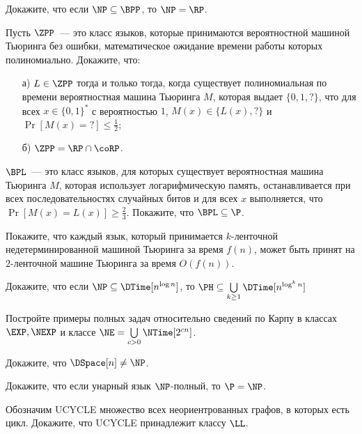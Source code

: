 

\begin{task}
    Докажите, что если $\NP \subseteq \BPP$, то $\NP = \RP$.
\end{task}


\begin{task}
    Пусть $\ZPP$~--- это класс языков, которые принимаются вероятностной машиной Тьюринга без ошибки, математическое ожидание
    времени работы которых полиномиально. Докажите, что:
    \begin{enumerate}[topsep = 0pt, itemsep = -1ex]
        \item [а)] $L \in \ZPP$ тогда и только тогда, когда существует полиномиальная по времени вероятностная машина Тьюринга
			$M$, которая выдает $\{0, 1, ?\}$, что для всех $x \in \{0, 1\}^*$ с вероятностью $1$, $M(x) \in \{L(x), ?\}$ и 
            $\Pr[M(x) = {?}] \le \frac{1}{2}$;
        \item [б)] $\ZPP = \RP \cap \coRP$.
    \end{enumerate}
\end{task}

\begin{task}
    $\BPL$~--- это класс языков, для которых существует вероятностная машина Тьюринга $M$, которая использует логарифмическую
    память, останавливается при всех последовательностях случайных битов и для всех $x$ выполняется, что $\Pr[M(x) = L(x)] \ge
    \frac{2}{3}$. Покажите, что $\BPL \subseteq \P$. 
\end{task}


\breakline

\begin{ptask}{8}
    Покажите, что каждый язык, который принимается $k$-ленточной недетерминированной машиной Тьюринга за время $f(n)$, может быть
    принят на $2$-ленточной машине Тьюринга за время $O(f(n))$.
\end{ptask}


\begin{ptask}{32}
	Докажите, что если $\NP \subseteq \DTime[n^{\log n}]$, то $\PH \subseteq \bigcup\limits_{k \ge 1} \DTime[n^{\log^k n}]$    
\end{ptask}


\begin{ptask}{35}
	Постройте примеры полных задач относительно сведений по Карпу в классах $\EXP, \NEXP$ и классе $\NE = \bigcup\limits_{c > 0}
    \NTime[2^{cn}]$.
\end{ptask}

\begin{ptask}{39}
	Докажите, что $\DSpace[n] \neq \NP$.
\end{ptask}


\begin{ptask}{41}
    Докажите, что если унарный язык $\NP$-полный, то $\P = \NP$.
\end{ptask}

\begin{ptask}{42}
	Обозначим UCYCLE множество всех неориентрованных графов, в которых есть цикл. Докажите, что UCYCLE принадлежит классу $\LL$. 
\end{ptask}
